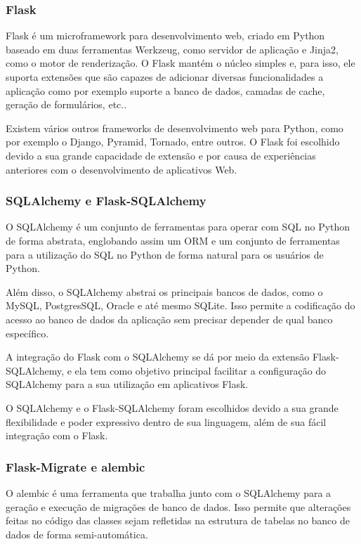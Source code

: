 \documentclass[
	article,			%
	11pt,				%
	oneside,			%
	a4paper,			%
	english,			%
	brazil,				%
	sumario=tradicional
	]{abntex2}
\begin{document}
\subsubsection{Flask}

Flask é um microframework para desenvolvimento web, criado em Python baseado
em duas ferramentas Werkzeug, como servidor de aplicação e Jinja2, como o motor
de renderização. O Flask mantém o núcleo simples e, para isso, ele suporta
extensões que são capazes de adicionar diversas funcionalidades a aplicação
como por exemplo suporte a banco de dados, camadas de cache, geração de
formulários, etc.. \cite{flask}

Existem vários outros frameworks de desenvolvimento web para Python, como por
exemplo o Django, Pyramid, Tornado, entre outros.  O Flask foi escolhido devido
a sua grande capacidade de extensão e por causa de experiências anteriores com
o desenvolvimento de aplicativos Web.


\subsubsection{SQLAlchemy e Flask-SQLAlchemy}

O SQLAlchemy é um conjunto de ferramentas para operar com SQL no Python de
forma abstrata, englobando assim um ORM e um conjunto de ferramentas para a
utilização do SQL no Python de forma natural para os usuários de Python. \cite{sqlalchemy}

Além disso, o SQLAlchemy abstrai os principais bancos de dados, como o MySQL,
PostgresSQL, Oracle e até mesmo SQLite. Isso permite a codificação do acesso ao
banco de dados da aplicação sem precisar depender de qual banco específico.

A integração do Flask com o SQLAlchemy se dá por meio da extensão
Flask-SQLAlchemy, e ela tem como objetivo principal facilitar a configuração do
SQLAlchemy para a sua utilização em aplicativos Flask. \cite{flasksqlalchemy}

O SQLAlchemy e o Flask-SQLAlchemy foram escolhidos devido a sua grande
flexibilidade e poder expressivo dentro de sua linguagem, além de sua fácil
integração com o Flask.

\subsubsection{Flask-Migrate e alembic}

O alembic é uma ferramenta que trabalha junto com o SQLAlchemy para a geração e
execução de migrações de banco de dados. Isso permite que alterações feitas no
código das classes sejam refletidas na estrutura de tabelas no banco de dados
de forma semi-automática. \cite{alembic}
\end{document}
